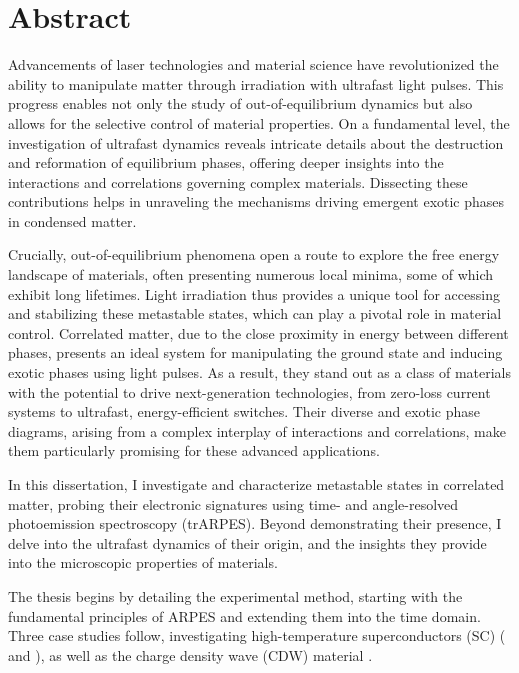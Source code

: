 

\cleardoublepage
\chapter*{Abstract}
Advancements of laser technologies and material science have revolutionized the ability to manipulate matter through irradiation with ultrafast light pulses.
This progress enables not only the study of out-of-equilibrium dynamics but also allows for the selective control of material properties.
On a fundamental level, the investigation of ultrafast dynamics reveals intricate details about the destruction and reformation of equilibrium phases, offering deeper insights into the interactions and correlations governing complex materials.
Dissecting these contributions helps in unraveling the mechanisms driving emergent exotic phases in condensed matter.

Crucially, out-of-equilibrium phenomena open a route to explore the free energy landscape of materials, often presenting numerous local minima, some of which exhibit long lifetimes.
Light irradiation thus provides a unique tool for accessing and stabilizing these metastable states, which can play a pivotal role in material control.
Correlated matter, due to the close proximity in energy between different phases, presents an ideal system for manipulating the ground state and inducing exotic phases using light pulses.
As a result, they stand out as a class of materials with the potential to drive next-generation technologies, from zero-loss current systems to ultrafast, energy-efficient switches.
Their diverse and exotic phase diagrams, arising from a complex interplay of interactions and correlations, make them particularly promising for these advanced applications.\hfill\break

In this dissertation, I investigate and characterize metastable states in correlated matter, probing their electronic signatures using time- and angle-resolved photoemission spectroscopy (trARPES).
Beyond demonstrating their presence, I delve into the ultrafast dynamics of their origin, and the insights they provide into the microscopic properties of materials.\hfill\break

The thesis begins by detailing the experimental method, starting with the fundamental principles of ARPES and extending them into the time domain.
Three case studies follow, investigating high-temperature superconductors (SC) ( and ), as well as the charge density wave (CDW) material .

